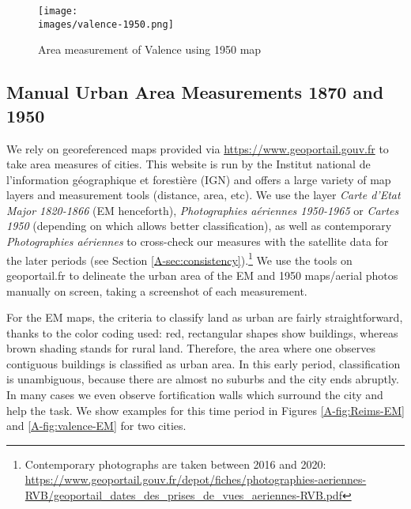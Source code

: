 \documentclass[11pt]{report}
\newcommand{\images}{../data/images}
\begin{document}
\begin{figure}[p]
	\centering
	\texttt{[image: \\images/valence-1950.png]}
	\caption{Area measurement of Valence using 1950 map\label{A-fig:valence-1950}}
\end{figure}

\subsection{Manual Urban Area Measurements 1870 and 1950}\label{A-subsec:manual-area}

We rely on georeferenced maps provided via \url{https://www.geoportail.gouv.fr} to take area measures of cities. This website is run by the Institut national de l’information géographique et forestière (IGN) and offers a large variety of map layers and measurement tools (distance, area, etc). We use the layer \emph{Carte d'Etat Major 1820-1866} (EM henceforth), \emph{Photographies aériennes 1950-1965} or \emph{Cartes 1950} (depending on which allows better classification), as well as contemporary \emph{Photographies aériennes} to cross-check our measures with the satellite data for the later periods (see Section \ref{A-sec:consistency}).\footnote{Contemporary photographs are taken between 2016 and 2020: \url{https://www.geoportail.gouv.fr/depot/fiches/photographies-aeriennes-RVB/geoportail_dates_des_prises_de_vues_aeriennes-RVB.pdf}} We use the tools on geoportail.fr to delineate the urban area of the EM and 1950 maps/aerial photos manually on screen, taking a screenshot of each measurement. 

For the EM maps, the criteria to classify land as urban are fairly straightforward, thanks to the color coding used: red, rectangular shapes show buildings, whereas brown shading stands for rural land. Therefore, the area where one observes contiguous buildings is classified as urban area. In this early period, classification is unambiguous, because there are almost no suburbs and the city ends abruptly. In many cases we even observe fortification walls which surround the city and help the task. We show examples for this time period in Figures \ref{A-fig:Reims-EM} and \ref{A-fig:valence-EM} for two cities.
\end{document}
